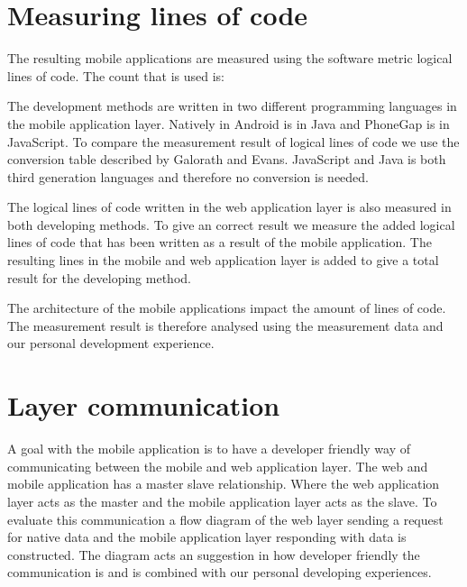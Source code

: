 \section{Measuring lines of code}
The resulting mobile applications are measured using the software metric logical lines of code. The count that is used is:

The development methods are written in two different programming languages in the mobile application layer. Natively in Android is in Java and PhoneGap is in JavaScript. To compare the measurement result of logical lines of code we use the conversion table described by Galorath and Evans\cite[p.~163]{galorath2006}. JavaScript and Java is both third generation languages and therefore no conversion is needed. 

The logical lines of code written in the web application layer is also measured in both developing methods. To give an correct result we measure the added logical lines of code that has been written as a result of the mobile application. The resulting lines in the mobile and web application layer is added to give a total result for the developing method. 

The architecture of the mobile applications impact the amount of lines of code. The measurement result is therefore analysed using the measurement data and our personal development experience.

\section{Layer communication}
A goal with the mobile application is to have a developer friendly way of communicating between the mobile and web application layer. The web and mobile application has a master slave relationship. Where the web application layer acts as the master and the mobile application layer acts as the slave. To evaluate this communication a flow diagram of the web layer sending a request for native data and the mobile application layer responding with data is constructed. The diagram acts an suggestion in how developer friendly the communication is and is combined with our personal developing experiences.
